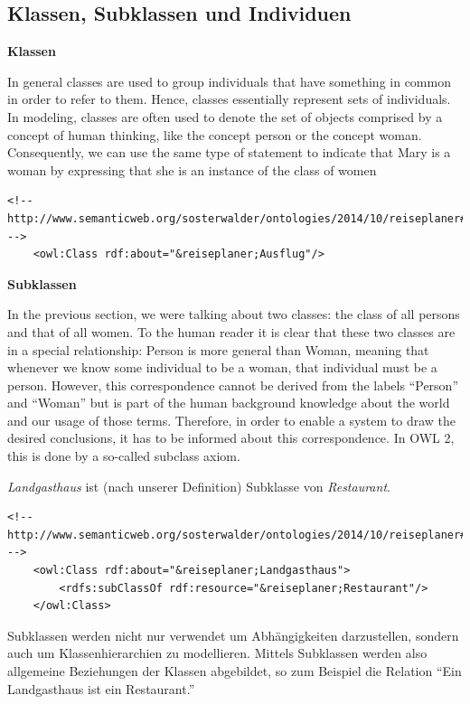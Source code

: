 \subsection{Klassen, Subklassen und Individuen}
\label{sec:owlRdf_owl_wissenModellieren_wichtigsteElemente_Classen}

\textbf{Klassen}

In general classes are used to group individuals that have something in common in order to refer to them. Hence, classes essentially represent sets of individuals. In modeling, classes are often used to denote the set of objects comprised by a concept of human thinking, like the concept person or the concept woman. Consequently, we can use the same type of statement to indicate that Mary is a woman by expressing that she is an instance of the class of women

\begin{lstlisting}[caption={Beispiel einer Klasse}]
    <!-- http://www.semanticweb.org/sosterwalder/ontologies/2014/10/reiseplaner#Ausflug -->
    <owl:Class rdf:about="&reiseplaner;Ausflug"/>
\end{lstlisting}

\textbf{Subklassen}

In the previous section, we were talking about two classes: the class of all persons and that of all women. To the human reader it is clear that these two classes are in a special relationship: Person is more general than Woman, meaning that whenever we know some individual to be a woman, that individual must be a person. However, this correspondence cannot be derived from the labels “Person” and “Woman” but is part of the human background knowledge about the world and our usage of those terms. Therefore, in order to enable a system to draw the desired conclusions, it has to be informed about this correspondence. In OWL 2, this is done by a so-called subclass axiom.

\textit{Landgasthaus} ist (nach unserer Definition) Subklasse von \textit{Restaurant}.

\begin{lstlisting}[caption={Beispiel einer Subklasse}]
    <!-- http://www.semanticweb.org/sosterwalder/ontologies/2014/10/reiseplaner#Landgasthaus -->
    <owl:Class rdf:about="&reiseplaner;Landgasthaus">
        <rdfs:subClassOf rdf:resource="&reiseplaner;Restaurant"/>
    </owl:Class>
\end{lstlisting}
Subklassen werden nicht nur verwendet um Abhängigkeiten darzustellen, sondern auch um Klassenhierarchien zu modellieren. Mittels Subklassen werden also allgemeine Beziehungen der Klassen abgebildet, so zum Beispiel die Relation ``Ein Landgasthaus ist ein Restaurant.''

